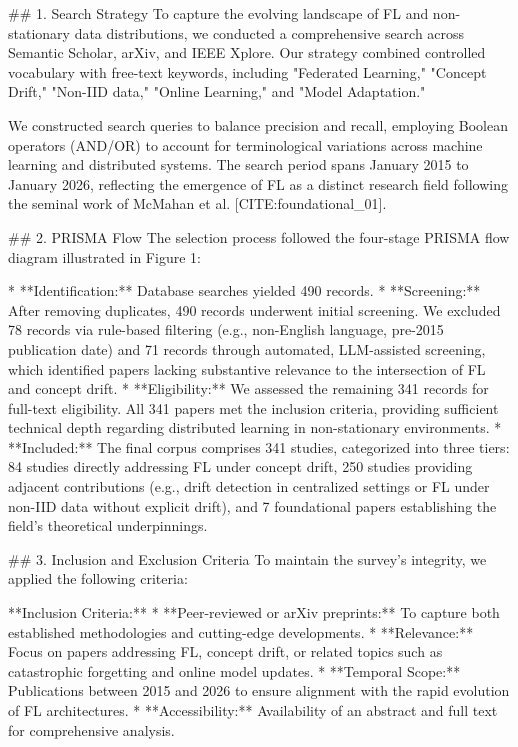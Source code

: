 \documentclass[journal]{IEEEtran}
\begin{document}
\#\# 1. Search Strategy
To capture the evolving landscape of FL and non-stationary data distributions, we conducted a comprehensive search across Semantic Scholar, arXiv, and IEEE Xplore. Our strategy combined controlled vocabulary with free-text keywords, including "Federated Learning," "Concept Drift," "Non-IID data," "Online Learning," and "Model Adaptation." 

We constructed search queries to balance precision and recall, employing Boolean operators (AND/OR) to account for terminological variations across machine learning and distributed systems. The search period spans January 2015 to January 2026, reflecting the emergence of FL as a distinct research field following the seminal work of McMahan et al. [CITE:foundational_01].

\#\# 2. PRISMA Flow
The selection process followed the four-stage PRISMA flow diagram illustrated in Figure 1:

*   **Identification:** Database searches yielded 490 records.
*   **Screening:** After removing duplicates, 490 records underwent initial screening. We excluded 78 records via rule-based filtering (e.g., non-English language, pre-2015 publication date) and 71 records through automated, LLM-assisted screening, which identified papers lacking substantive relevance to the intersection of FL and concept drift.
*   **Eligibility:** We assessed the remaining 341 records for full-text eligibility. All 341 papers met the inclusion criteria, providing sufficient technical depth regarding distributed learning in non-stationary environments.
*   **Included:** The final corpus comprises 341 studies, categorized into three tiers: 84 studies directly addressing FL under concept drift, 250 studies providing adjacent contributions (e.g., drift detection in centralized settings or FL under non-IID data without explicit drift), and 7 foundational papers establishing the field's theoretical underpinnings.

\#\# 3. Inclusion and Exclusion Criteria
To maintain the survey's integrity, we applied the following criteria:

**Inclusion Criteria:**
*   **Peer-reviewed or arXiv preprints:** To capture both established methodologies and cutting-edge developments.
*   **Relevance:** Focus on papers addressing FL, concept drift, or related topics such as catastrophic forgetting and online model updates.
*   **Temporal Scope:** Publications between 2015 and 2026 to ensure alignment with the rapid evolution of FL architectures.
*   **Accessibility:** Availability of an abstract and full text for comprehensive analysis.
\end{document}

